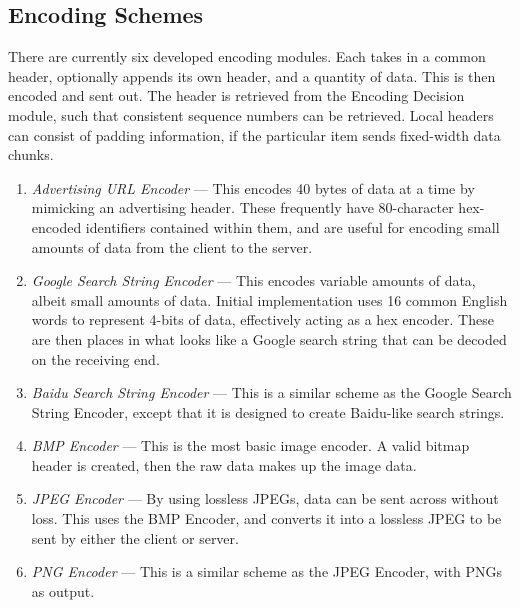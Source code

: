 \subsection{Encoding Schemes}
There are currently six developed encoding modules. Each takes in a common header, optionally appends its own header, and a quantity of data. This is then encoded and sent out. The header is retrieved from the Encoding Decision module, such that consistent sequence numbers can be retrieved. Local headers can consist of padding information, if the particular item sends fixed-width data chunks. 

\begin{enumerate}
  \item \emph{Advertising URL Encoder} --- This encodes 40 bytes of data at a time by mimicking an advertising header. These frequently have 80-character hex-encoded identifiers contained within them, and are useful for encoding small amounts of data from the client to the server.
  \item \emph{Google Search String Encoder} --- This encodes variable amounts of data, albeit small amounts of data. Initial implementation uses 16 common English words to represent 4-bits of data, effectively acting as a hex encoder. These are then places in what looks like a Google search string that can be decoded on the receiving end.
  \item \emph{Baidu Search String Encoder} --- This is a similar scheme as the Google Search String Encoder, except that it is designed to create Baidu-like search strings.
  \item \emph{BMP Encoder} --- This is the most basic image encoder. A valid bitmap header is created, then the raw data makes up the image data.
  \item \emph{JPEG Encoder} --- By using lossless JPEGs, data can be sent across without loss. This uses the BMP Encoder, and converts it into a lossless JPEG to be sent by either the client or server.
  \item \emph{PNG Encoder} --- This is a similar scheme as the JPEG Encoder, with PNGs as output.
\end{enumerate}